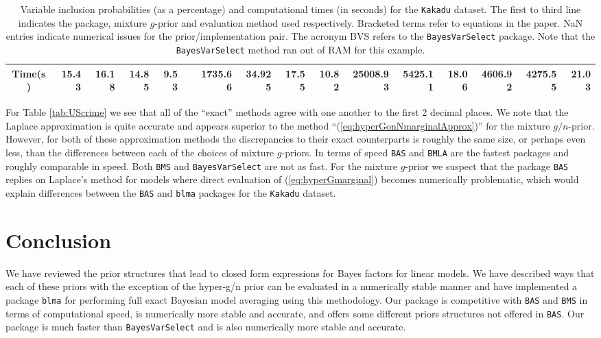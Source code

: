 \begin{sidewaystable}[h!]
\begin{center}
{\begin{tabular}{c|r|r|rrrrrr|rrrr|rrr}
				Time(s) & 15.43 & 16.18 & 14.85  &  9.53   &       & 1735.66  & 34.925  &   17.55 &  10.82         &  25008.93 & 
				5425.11  &   18.06   & 4606.92       &  4275.55  & 21.03  \\ 
				\hline
			\end{tabular}
		}
	\end{center}
	\caption{Variable inclusion probabilities (as a percentage) and computational times (in seconds) for the {\tt Kakadu} dataset.
		The first to third line indicates the package, mixture $g$-prior and evaluation method used respectively. Bracketed terms
		refer to equations in the paper. NaN entries indicate numerical issues for the prior/implementation pair. The acronym BVS refers to the {\tt BayesVarSelect} package. Note that 
		the {\tt BayesVarSelect} method ran out of RAM for this example.}
	\label{tab:Kakadu}
\end{sidewaystable}


For Table \ref{tab:UScrime} we see that all of the ``exact'' methods agree with one another to the first 2 decimal 
places. We note that the Laplace approximation is quite accurate and appears superior to  the method
``(\ref{eq:hyperGonNmarginalApprox})'' for the mixture $g/n$-prior. However, for both of these approximation
methods the discrepancies to their exact counterparts is roughly the same size, or perhaps even less, than
the differences between each of the choices of mixture $g$-priors. In terms of speed {\tt BAS} and {\tt BMLA} are
the fastest packages and roughly comparable in speed. Both {\tt BMS} and {\tt BayesVarSelect} are not as fast.
For the mixture $g$-prior we suspect that the package {\tt BAS} replies on Laplace's method for models
where direct evaluation of (\ref{eq:hyperGmarginal}) becomes numerically problematic, which would explain
differences between the {\tt BAS} and {\tt blma} packages for the {\tt Kakadu} dataset.

\section{Conclusion}
\label{sec:chapter_3_conclusion}
We have reviewed the prior structures that lead to closed form expressions for Bayes factors for linear
models. We have described ways that each of these priors with the exception of the hyper-g/n prior can be
evaluated in a numerically stable manner and have implemented a package \texttt{blma} for performing full
exact Bayesian model averaging using this methodology. Our package is competitive with \texttt{BAS} and
\texttt{BMS} in terms of computational speed, is numerically more stable and accurate, and offers some
different priors structures not offered in \texttt{BAS}. Our package is much faster than
\texttt{BayesVarSelect} and is also numerically more stable and accurate.


